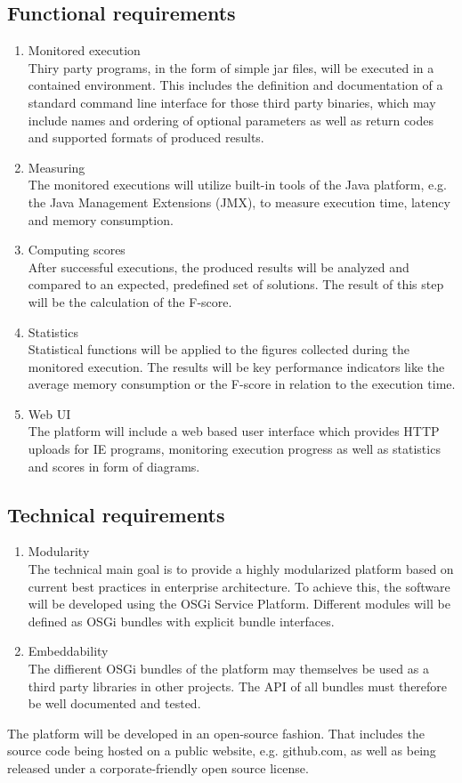 \documentclass[a4paper]{article}
\begin{document}
\subsection{Functional requirements}
\begin{enumerate}
	\item Monitored execution \\
		Thiry party programs, in the form of simple jar files, will be executed in a contained environment. This includes the definition and documentation of a standard command line interface for those third party binaries, which may include names and ordering of optional parameters as well as return codes and supported formats of produced results.
	\item Measuring \\
		The monitored executions will utilize built-in tools of the Java platform, e.g. the Java Management Extensions (JMX), to measure execution time, latency and memory consumption.
	\item Computing scores \\
		After successful executions, the produced results will be analyzed and compared to an expected, predefined set of solutions. The result of this step will be the calculation of the F-score.
	\item Statistics \\
		Statistical functions will be applied to the figures collected during the monitored execution. The results will be key performance indicators like the average memory consumption or the F-score in relation to the execution time.
	\item Web UI \\
		The platform will include a web based user interface which provides HTTP uploads for IE programs, monitoring execution progress as well as statistics and scores in form of  diagrams.
\end{enumerate}

\subsection{Technical requirements}
\begin{enumerate}
	\item Modularity \\
		The technical main goal is to provide a highly modularized platform based on current best practices in enterprise architecture. To achieve this, the software will be developed using the OSGi\cite{OSGI} Service Platform. Different modules will be defined as OSGi bundles with explicit bundle interfaces.
	\item Embeddability \\
		The diffierent OSGi bundles of the platform may themselves be used as a third party libraries in other projects. The API of all bundles must therefore be well documented and tested.
\end{enumerate}

The platform will be developed in an open-source fashion. That includes the source code being hosted on a public website, e.g. github.com, as well as being released under a corporate-friendly open source license.

\nocite{*}
\printbibliography
\end{document}
